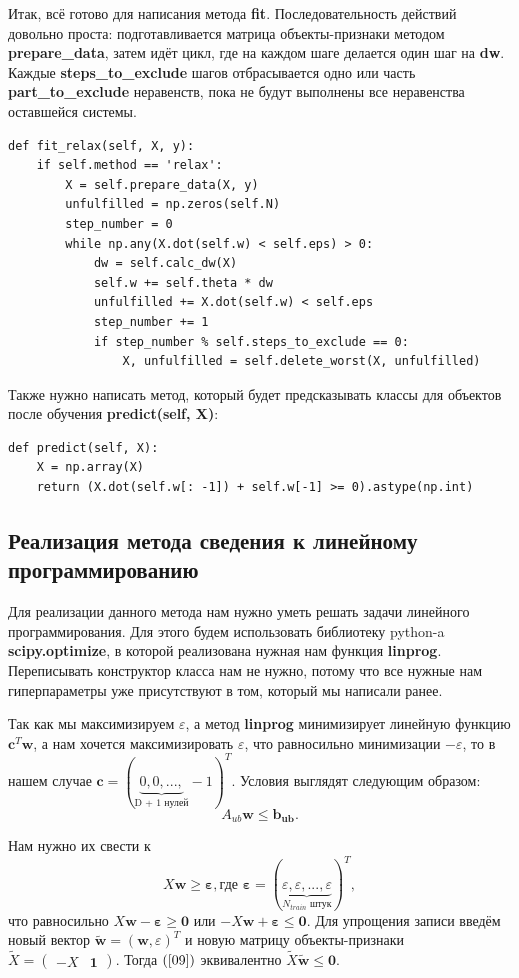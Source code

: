 \documentclass[a4paper]{article}
\newcommand{\w}{\bm{w}}
\newcommand{\veps}{\bm{\varepsilon}}
\begin{document}
Итак, всё готово для написания метода \textbf{fit}. Последовательность действий довольно проста: подготавливается матрица объекты-признаки методом \textbf{prepare\_data}, затем идёт цикл, где на каждом шаге делается один шаг на \textbf{dw}. Каждые \textbf{steps\_to\_exclude} шагов отбрасывается одно или часть \textbf{part\_to\_exclude} неравенств, пока не будут выполнены все неравенства оставшейся системы.
\begin{lstlisting}
def fit_relax(self, X, y):
	if self.method == 'relax':
		X = self.prepare_data(X, y)
		unfulfilled = np.zeros(self.N)
		step_number = 0
		while np.any(X.dot(self.w) < self.eps) > 0:
			dw = self.calc_dw(X)
			self.w += self.theta * dw
			unfulfilled += X.dot(self.w) < self.eps
			step_number += 1
			if step_number % self.steps_to_exclude == 0:
				X, unfulfilled = self.delete_worst(X, unfulfilled)
\end{lstlisting}

Также нужно написать метод, который будет предсказывать классы для объектов после обучения \textbf{predict(self, X)}:
\begin{lstlisting}
def predict(self, X):
	X = np.array(X)
	return (X.dot(self.w[: -1]) + self.w[-1] >= 0).astype(np.int)
\end{lstlisting}


\subsection{Реализация метода сведения к линейному программированию}

Для реализации данного метода нам нужно уметь решать задачи линейного программирования. Для этого будем использовать библиотеку python-a \textbf{scipy.optimize}, в которой реализована нужная нам функция \textbf{linprog}. Переписывать конструктор класса нам не нужно, потому что все нужные нам гиперпараметры уже присутствуют в том, который мы написали ранее.

Так как мы максимизируем $\varepsilon$, а метод \textbf{linprog} минимизирует линейную функцию $\bm{c}^T\w$, а нам хочется максимизировать $\varepsilon$, что равносильно минимизации $- \varepsilon$, то в нашем случае $\bm{c} = (\underbrace{0, 0, ...,}_\text{D + 1 нулей}-1)^T$. Условия выглядят следующим образом:
\begin{equation}\label{08}
A_{ub}\w \le \bm{b_{ub}} .
\end{equation}

Нам нужно их свести к 
\begin{equation}\label{09}
X\w \ge \veps , \text{где } \veps = (\underbrace{\varepsilon, \varepsilon, ..., \varepsilon}_\text{$N_{train}$ штук})^T,
\end{equation}
что равносильно $X\w - \veps \ge \bm{0}$ или $-X\w + \veps \le \bm{0}$. Для упрощения записи введём новый вектор $\tilde{\w} = (\w, \varepsilon)^T$ и новую матрицу объекты-признаки
$\tilde{X} = \left(\begin{array}{c|c}
- X &  \bm{1}
\end{array}\right)$. Тогда $(\ref{09})$ эквивалентно $\tilde{X}\tilde{\w} \le \bm{0}$.
\end{document}
